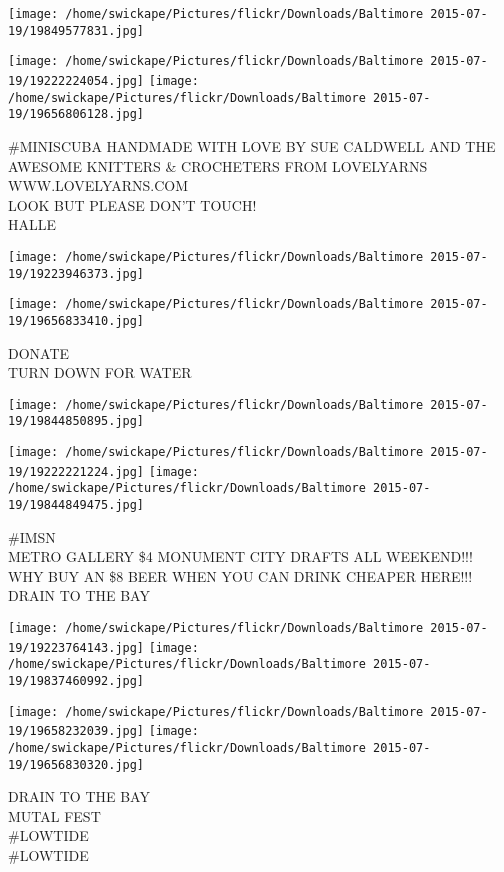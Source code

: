 \documentclass[10pt,letterpaper]{article}
\begin{document}
\texttt{[image: /home/swickape/Pictures/flickr/Downloads/Baltimore 2015-07-19/19849577831.jpg]}

\vspace{0.25in}
\texttt{[image: /home/swickape/Pictures/flickr/Downloads/Baltimore 2015-07-19/19222224054.jpg]}
\texttt{[image: /home/swickape/Pictures/flickr/Downloads/Baltimore 2015-07-19/19656806128.jpg]}

\#MINISCUBA HANDMADE WITH LOVE BY SUE CALDWELL AND THE AWESOME KNITTERS \& CROCHETERS FROM LOVELYARNS WWW.LOVELYARNS.COM\\
LOOK BUT PLEASE DON'T TOUCH!\\
HALLE
\pagebreak

\texttt{[image: /home/swickape/Pictures/flickr/Downloads/Baltimore 2015-07-19/19223946373.jpg]}

\vspace{0.25in}
\texttt{[image: /home/swickape/Pictures/flickr/Downloads/Baltimore 2015-07-19/19656833410.jpg]}

DONATE\\
TURN DOWN FOR WATER
\pagebreak

\texttt{[image: /home/swickape/Pictures/flickr/Downloads/Baltimore 2015-07-19/19844850895.jpg]}

\vspace{0.25in}
\texttt{[image: /home/swickape/Pictures/flickr/Downloads/Baltimore 2015-07-19/19222221224.jpg]}
\texttt{[image: /home/swickape/Pictures/flickr/Downloads/Baltimore 2015-07-19/19844849475.jpg]}

\#IMSN\\
METRO GALLERY \$4 MONUMENT CITY DRAFTS ALL WEEKEND!!!  WHY BUY AN \$8 BEER WHEN YOU CAN DRINK CHEAPER HERE!!!\\
DRAIN TO THE BAY
\pagebreak

\texttt{[image: /home/swickape/Pictures/flickr/Downloads/Baltimore 2015-07-19/19223764143.jpg]}
\texttt{[image: /home/swickape/Pictures/flickr/Downloads/Baltimore 2015-07-19/19837460992.jpg]}

\texttt{[image: /home/swickape/Pictures/flickr/Downloads/Baltimore 2015-07-19/19658232039.jpg]}
\texttt{[image: /home/swickape/Pictures/flickr/Downloads/Baltimore 2015-07-19/19656830320.jpg]}

DRAIN TO THE BAY\\
MUTAL FEST\\
\#LOWTIDE\\
\#LOWTIDE
\pagebreak
\end{document}
